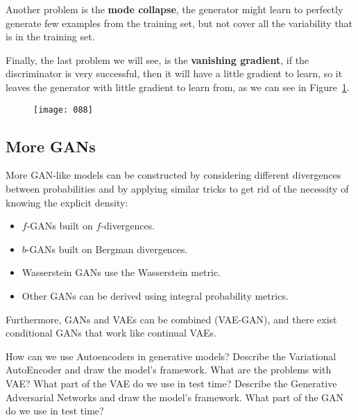 Another problem is the \textbf{mode collapse}, the generator might learn to perfectly generate few examples from the training set, but not cover all the variability that is in the training set.

Finally, the last problem we will see, is the \textbf{vanishing gradient}, if the discriminator is very successful, then it will have a little gradient to learn, so it leaves the generator with little gradient to learn from, as we can see in Figure~\ref{fig:088}.

\begin{figure}[h!]
    \centering
    \texttt{[image: 088]}
    \caption{}
    \label{fig:088}
\end{figure}

\subsection{More GANs}
More GAN-like models can be constructed by considering different divergences between probabilities and by applying similar tricks to get rid of the necessity of knowing the explicit density:
\begin{itemize}[topsep={0pt}, partopsep={0pt}]
    \itemsep0pt
    \item \(f\)-GANs built on \(f\)-divergences.
    \item \(b\)-GANs built on Bergman divergences.
    \item Wasserstein GANs use the Wasserstein metric.
    \item Other GANs can be derived using integral probability metrics.
\end{itemize}
Furthermore, GANs and VAEs can be combined (VAE-GAN), and there exist conditional GANs that work like continual VAEs.

\newpage
\begin{exercise}
    \ex How can we use Autoencoders in generative models?
    \ex[!] Describe the Variational AutoEncoder and draw the model's framework.
    \ex What are the problems with VAE?
    \ex What part of the VAE do we use in test time?
    \ex[!] Describe the Generative Adversarial Networks and draw the model's framework.
    \ex What part of the GAN do we use in test time?
\end{exercise}